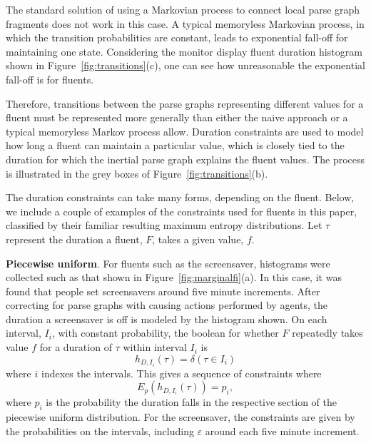 \documentclass[10pt,journal,letterpaper,compsoc]{IEEEtran}
\begin{document}
The standard solution of using a Markovian process to connect local parse graph fragments does not work in this case.  A typical memoryless Markovian process, in which the transition probabilities are constant, leads to exponential fall-off for maintaining one state.  Considering the monitor display fluent duration histogram shown in Figure~\ref{fig:transitions}(c), one can see how unreasonable the exponential fall-off is for fluents.

Therefore, transitions between the parse graphs representing different values for a fluent must be represented more generally than either the naive approach or a typical memoryless Markov process allow.  Duration constraints are used to model how long a fluent can maintain a particular value, which is closely tied to the duration for which the inertial parse graph explains the fluent values.  The process is illustrated in the grey boxes of Figure~\ref{fig:transitions}(b).  

The duration constraints can take many forms, depending on the fluent.  Below, we include a couple of examples of the constraints used for fluents in this paper, classified by their familiar resulting maximum entropy distributions.  Let $\tau$ represent the duration a fluent, $F$, takes a given value, $f$.  

\textbf{Piecewise uniform}.  For fluents such as the screensaver, histograms were collected such as that shown in Figure~\ref{fig:marginalfi}(a).  In this case, it was found that people set screensavers around five minute increments.
After correcting for parse graphs with causing actions performed by agents, the duration a screensaver is off is modeled by the histogram shown.  On each interval, $I_i$, with constant probability, the boolean for whether $F$ repeatedly takes value $f$ for a duration of $\tau$ within interval $I_i$ is 
\begin{equation}
h_{D, I_i} (\tau) = \delta(\tau \in I_i)
\end{equation}
where $i$ indexes the intervals.  This gives a sequence of constraints where 
\begin{equation}
E_p \left( h_{D, I_i} (\tau) \right) = p_i,
\end{equation}
where $p_i$ is the probability the duration falls in the respective section of the piecewise uniform distribution.  For the screensaver, the constraints are given by the probabilities on the intervals, including $\varepsilon$ around each five minute increment.
\end{document}
